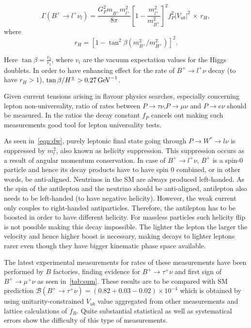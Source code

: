 \begin{equation}
\Gamma(B^{+} \rightarrow {l^{+}} \nu_{l})=  
        \frac{G_{F}^{2} m^{}_{B^{+}}  m_{l^{+}}^{2}}{8\pi} 
        \left[1 - \frac{m_{l^{+}}^{2}}{m_{B^{+}}^{2}}\right]^{2}  
	f_{P}^{2} |V_{ub}|^{2} \,\times\, r_H,
\end{equation}
where
\begin{equation}
	r_H=[1-\tan^2\beta(m^{2}_{B^{+}}/m^{2}_{H^{+}})]^2.
\end{equation}

Here $\tan\beta = \frac{v_{2}}{v_{1}}$, where $v_{i}$ are the vacuum expectation values for the Higgs doublets. In order to have enhancing effect for the rate of $B^{+}\rightarrow l^{+}\nu$ decay (to have $r_{H}>1$), $\tan\beta/H^{\pm}> 0.27 \mathrm{\,Ge\kern -0.1em V}^{-1}$.

Given current tensions arising in flavour physics searches, especially concerning lepton non-universality, ratio of rates between $P\rightarrow\tau\nu$,$P\rightarrow\mu\nu$ and $P\rightarrow e\nu$ should be measured. In the ratios the decay constant $f_{P}$ cancels out making such measurements good tool for lepton universality tests.

As seen in~\autoref{eqn:dw}, purely leptonic final state going through $P\rightarrow W^{*}\rightarrow l \nu$ is suppressed by $m^{2}_{l}$, also known as helicity suppression. This suppression occurs as a result of angular momentum conservation. In case of $B^{+}\rightarrow l^{+} \nu$, $B^{+}$ is a spin-0 particle and hence its decay products have to have spin 0 combined, or in other words, be anti-aligned. Neutrinos in the \gls{SM} are always produced left-handed. As the spin of the antilepton and the neutrino should be anti-aligned, antilepton also needs to be left-handed (to have negative helicity). However, the weak current only couples to right-handed antiparticles. Therefore, the antilepton has to be boosted in order to have different helicity. For massless particles such helicity flip is not possible making this decay impossible. The lighter the lepton the larger the velocity and hence higher boost is necessary, making decays to lighter leptons rarer even though they have bigger kinematic phase space available.

The latest experimental measurements for rates of these measurements have been performed by $B$ factories, finding evidence for $B^{+}\rightarrow \tau^{+}\nu$ and first sign of $B^{+}\rightarrow \mu^{+}\nu$ as seen in~\autoref{tab:sum}. These results are to be compared with \gls{SM} prediction $\mathcal{B}(B^{+}\rightarrow \tau^{+}\nu) = (0.82+0.03-0.02)\times10^{-4}$\cite{Charles:2004jd} which is obtained by using unitarity-constrained $V_{ub}$ value aggregated from other measurements and lattice calculations of $f_{B}$. Quite substantial statistical as well as systematical errors show the difficulty of this type of measurements. 

